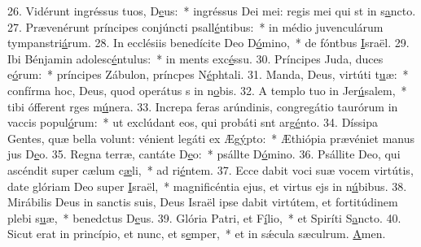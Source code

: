 26. Vidérunt ingréssus tuos, D\uline{e}us:~* ingréssus Dei mei: regis mei qui st in s\uline{a}ncto.
27. Prævenérunt príncipes conjúncti psall\uline{é}ntibus:~* in médio juvenculárum tympanstri\uline{á}rum.
28. In ecclésiis benedícite Deo D\uline{ó}mino,~* de fóntbus \uline{I}sraël.
29. Ibi Bénjamin adolesc\uline{é}ntulus:~* in ments exc\uline{é}ssu.
30. Príncipes Juda, duces e\uline{ó}rum:~* príncipes Zábulon, príncpes N\uline{é}phtali.
31. Manda, Deus, virtúti t\uline{u}æ:~* confírma hoc, Deus, quod operátus s in n\uline{o}bis.
32. A templo tuo in Jer\uline{ú}salem,~* tibi ófferent rges m\uline{ú}nera.
33. Increpa feras arúndinis, congregátio taurórum in vaccis popul\uline{ó}rum:~* ut exclúdant eos, qui probáti snt arg\uline{é}nto.
34. Díssipa Gentes, quæ bella volunt: vénient legáti ex Æg\uline{ý}pto:~* Æthiópia prævéniet manus jus D\uline{e}o.
35. Regna terræ, cantáte D\uline{e}o:~* psállte D\uline{ó}mino.
36. Psállite Deo, qui ascéndit super cælum c\uline{æ}li,~* ad ri\uline{é}ntem.
37. Ecce dabit voci suæ vocem virtútis, date glóriam Deo super \uline{I}sraël,~* magnificéntia ejus, et virtus ejs in n\uline{ú}bibus.
38. Mirábilis Deus in sanctis suis, Deus Israël ipse dabit virtútem, et fortitúdinem plebi s\uline{u}æ,~* benedctus D\uline{e}us.
39. Glória Patri, et F\uline{í}lio,~* et Spiríti S\uline{a}ncto.
40. Sicut erat in princípio, et nunc, et s\uline{e}mper,~* et in sǽcula sæculrum. \uline{A}men.
